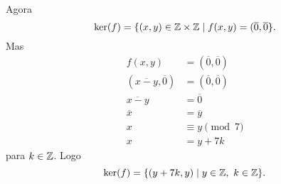 \documentclass[12pt]{article}
\begin{document}
Agora
\[
	\ker(f) = \{(x,y) \in \mathbb{Z}\times\mathbb{Z} \mid f(x,y) = (\overline{0},\overline{0}\}.
\]
Mas
\begin{align*}
	f(x,y) &= (\overline{0},\overline{0})\\
	(\overline{x-y},\overline{0}) &= (\overline{0},\overline{0})\\
	\overline{x-y} &= \overline{0}\\
	\overline{x} &= \overline{y}\\
	x &\equiv y \pmod 7\\
	x &= y + 7k
\end{align*}
para $k \in \mathbb{Z}$. Logo
\[
	\ker(f) = \{(y+7k,y) \mid y\in \mathbb{Z},\ k \in \mathbb{Z}\}.
\]
\end{document}
